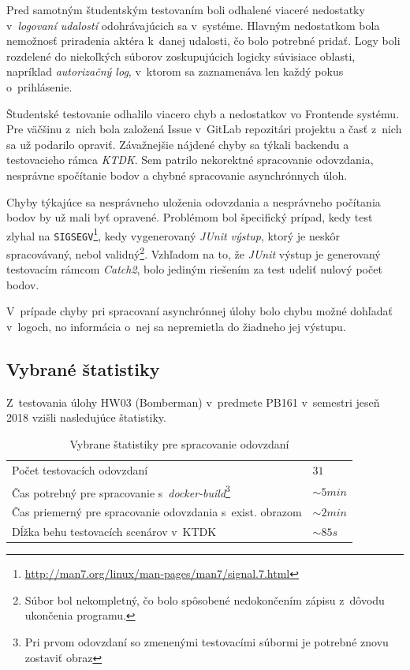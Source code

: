 \documentclass[
  digital, %
  oneside, %
  table,   %
  lof,     %
  lot,   %
]{fithesis3}
\begin{document}
Pred samotným študentským testovaním boli odhalené viaceré nedostatky v~\emph{logovaní udalostí} odohrávajúcich sa v~systéme. Hlavným nedostatkom bola nemožnosť priradenia aktéra k~danej udalosti, čo bolo potrebné pridať. Logy boli rozdelené do niekoľkých súborov zoskupujúcich logicky súvisiace oblasti, napríklad \emph{autorizačný log}, v~ktorom sa zaznamenáva len každý pokus o~prihlásenie.

Študentské testovanie odhalilo viacero chyb a nedostatkov vo Frontende systému. Pre väčšinu z~nich bola založená Issue v~GitLab repozitári projektu a časť z~nich sa už podarilo opraviť. Závažnejšie nájdené chyby sa týkali backendu a testovacieho rámca \emph{KTDK}. Sem patrilo nekorektné spracovanie odovzdania, nesprávne spočítanie bodov a chybné spracovanie asynchrónnych úloh.

Chyby týkajúce sa nesprávneho uloženia odovzdania a nesprávneho počítania bodov by už mali byť opravené. Problémom bol špecifický prípad, kedy test zlyhal na \texttt{SIGSEGV}\footnote{\url{http://man7.org/linux/man-pages/man7/signal.7.html}}, kedy vygenerovaný \emph{JUnit výstup}, ktorý je neskôr spracovávaný, nebol validný\footnote{Súbor bol nekompletný, čo bolo spôsobené nedokončením zápisu z~dôvodu ukončenia programu.}. Vzhľadom na to, že \emph{JUnit} výstup je generovaný testovacím rámcom \emph{Catch2}, bolo jediným riešením za test udeliť nulový počet bodov.

V~prípade chyby pri spracovaní asynchrónnej úlohy bolo chybu možné dohľadať v~logoch, no informácia o~nej sa nepremietla do žiadneho jej výstupu.

\subsection{Vybrané štatistiky}

Z~testovania úlohy HW03 (Bomberman) v~predmete PB161 v~semestri jeseň 2018 vzišli nasledujúce štatistiky.

\begin{table}[h]
\begin{tabular}{l l}
Počet testovacích odovzdaní & $31$  \\
Čas potrebný pre spracovanie s~\emph{docker-build}\footnote{Pri prvom odovzdaní so zmenenými testovacími súbormi je potrebné znovu zostaviť obraz} & $ \sim 5 min $ \\
Čas priemerný pre spracovanie odovzdania s~exist. obrazom & $\sim 2 min$\\
Dĺžka behu testovacích scenárov v~KTDK &  $\sim 85 s$ \\
\end{tabular}
\caption{Vybrane štatistiky pre spracovanie odovzdaní} \label{tab:proc-time-general}
\end{table}
\end{document}
